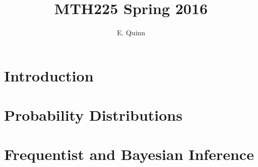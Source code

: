 \documentclass[12pt]{amsbook}
\theoremstyle{plain}
\numberwithin{section}{chapter}
\begin{document}
\title{MTH225 Spring 2016}
\maketitle
\author{E. Quinn}
\setcounter{tocdepth}{4} 
\tableofcontents
\mainmatter 
\chapter{Introduction}

\chapter{Probability Distributions}

\chapter{Frequentist and Bayesian Inference}

\end{document}
